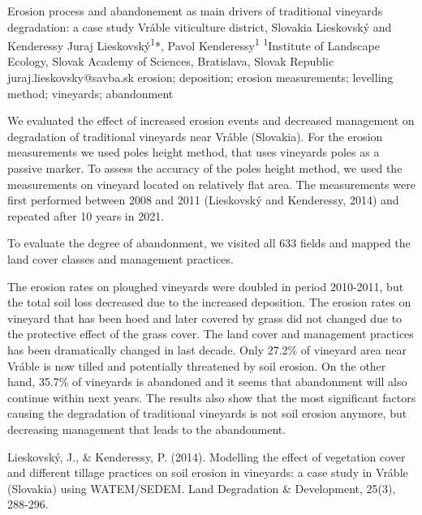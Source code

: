 \abstract
{Erosion process and abandonement as main drivers of traditional vineyards degradation: a case study Vráble viticulture district, Slovakia} 
{Lieskovský and Kenderessy} 
{Juraj Lieskovský\textsuperscript{1}*, Pavol Kenderessy\textsuperscript{1}} 
{\TLtag} 
{
\textsuperscript{1}Institute of Landscape Ecology, Slovak Academy of Sciences, Bratislava, Slovak Republic
}
{juraj.lieskovsky@savba.sk}  %
{erosion; deposition; erosion measurements; levelling method; vineyards; abandonment}
{We evaluated the effect of increased erosion events and decreased management on degradation of traditional vineyards near Vráble (Slovakia). For the erosion measurements we used poles height method, that uses vineyards poles as a passive marker. To assess the accuracy of the poles height method, we used the measurements on vineyard located on relatively flat area. The measurements were first performed between 2008 and 2011 (Lieskovský and Kenderessy, 2014) and repeated after 10 years in 2021.

To evaluate the degree of abandonment, we visited all 633 fields and mapped the land cover classes and management practices. 

The erosion rates on ploughed vineyards were doubled in period 2010-2011, but the total soil loss decreased due to the increased deposition. The erosion rates on vineyard that has been hoed and later covered by grass did not changed due to the protective effect of the grass cover. The land cover and management practices has been dramatically changed in last decade. Only 27.2\% of vineyard area near Vráble is now tilled and potentially threatened by soil erosion. On the other hand, 35.7\% of vineyards is abandoned and it seems that abandonment will also continue within next years. The results also show that the most significant factors causing the degradation of traditional vineyards is not soil erosion anymore, but decreasing management that leads to the abandonment.
}
{Lieskovský, J., \& Kenderessy, P. (2014). Modelling the effect of vegetation cover and different tillage practices on soil erosion in vineyards: a case study in Vráble (Slovakia) using WATEM/SEDEM. Land Degradation \& Development, 25(3), 288-296.
}

